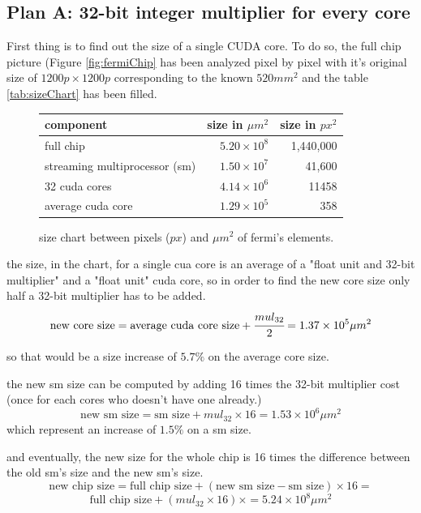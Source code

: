 \documentclass{report}
\begin{document}
   \subsection{Plan A: 32-bit integer multiplier for every core}
   First thing is to find out the size of a single CUDA core. To do so, the full chip picture (Figure \ref{fig:fermiChip} has been analyzed pixel by pixel with it's original size of $1200p \times 1200p$ corresponding to
   the known $520mm^2$ and the table \ref{tab:sizeChart} has been filled.
   \begin{figure}[H]
    \centering
        \begin{tabular}{ | l | r | r | }
    	    \hline
    	    component & size in $\mu m^2$ & size in $px^2$ \\ \hline
    	    full chip &  $5.20 \times 10^8$ & 1,440,000 \\
            streaming multiprocessor (sm) & $1.50 \times 10^7$ & 41,600 \\
            32 cuda cores & $4.14 \times 10^6$ & 11458 \\
            average cuda core & $1.29 \times 10^5$ &  358 \\ \hline
  	    \end{tabular}
  	\captionsetup{justification=centering}
  	\caption{size chart between pixels ($px$) and $\mu m^2$ of fermi's elements.}
  	\label{tab:sizechart}
    \end{figure}
    
    the size, in the chart, for a single cua core is an average of a "float unit and 32-bit multiplier"
    and a "float unit" cuda core, so in order to find the new core size only half a 32-bit multiplier has to be added.
    \[\text{new core size} = \text{average cuda core size} + \cfrac{mul_{32}}{2} = 1.37 \times 10^5 \mu m^2 \] 
    
    so that would be a size increase of $5.7\%$ on the average core size.
    
    the new sm size can be computed by adding 16 times the 32-bit multiplier cost (once for each cores who doesn't have one already.)
    \[\text{new sm size} = \text{sm size} + mul_{32} \times 16 = 1.53 \times 10^6 \mu m^2 \]
    which represent an increase of $1.5\%$ on a sm size.
    
    and eventually, the new size for the whole chip is 16 times the difference between the old sm's size and the new sm's size.
    \[\text{new chip size} = \text{full chip size} + (\text{new sm size} - \text{sm size}) \times 16 =\]
    \[\text{full chip size} + (mul_{32} \times 16) \times  = 5.24 \times 10^8 \mu m^2 \]
   
\end{document}

